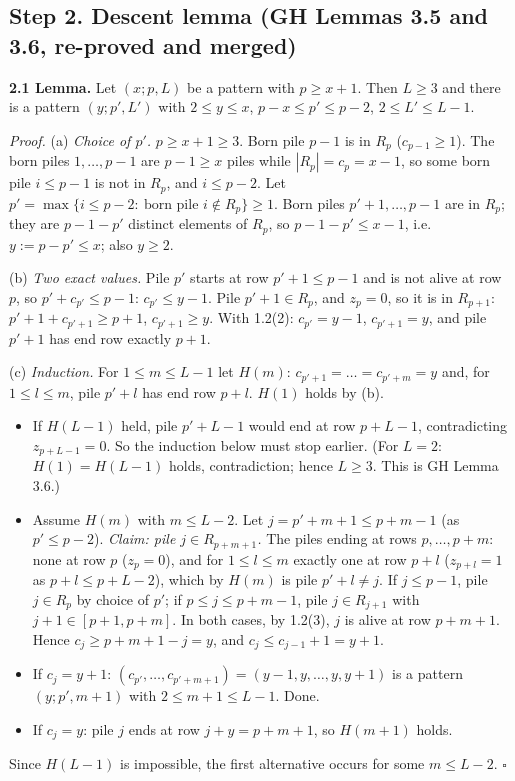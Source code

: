 \documentclass[11pt]{article}
\begin{document}
\subsection*{Step 2. Descent lemma (GH Lemmas 3.5 and 3.6, re-proved and merged)}

\textbf{2.1 Lemma.} Let $(x;p,L)$ be a pattern with $p\ge x+1$. Then $L\ge3$ and there is a pattern $(y;p',L')$ with $2\le y\le x$, $p-x\le p'\le p-2$, $2\le L'\le L-1$.

\emph{Proof.} (a) \emph{Choice of $p'$.} $p\ge x+1\ge3$. Born pile $p-1$ is in $R_p$ ($c_{p-1}\ge1$). The born piles $1,\dots,p-1$ are $p-1\ge x$ piles while $|R_p|=c_p=x-1$, so some born pile $i\le p-1$ is not in $R_p$, and $i\le p-2$. Let $p'=\max\{i\le p-2:\ \text{born pile } i\notin R_p\}\ge1$. Born piles $p'+1,\dots,p-1$ are in $R_p$; they are $p-1-p'$ distinct elements of $R_p$, so $p-1-p'\le x-1$, i.e.\ $y:=p-p'\le x$; also $y\ge2$.

(b) \emph{Two exact values.} Pile $p'$ starts at row $p'+1\le p-1$ and is not alive at row $p$, so $p'+c_{p'}\le p-1$: $c_{p'}\le y-1$. Pile $p'+1\in R_p$, and $z_p=0$, so it is in $R_{p+1}$: $p'+1+c_{p'+1}\ge p+1$, $c_{p'+1}\ge y$. With 1.2(2): $c_{p'}=y-1$, $c_{p'+1}=y$, and pile $p'+1$ has end row exactly $p+1$.

(c) \emph{Induction.} For $1\le m\le L-1$ let $H(m)$: $c_{p'+1}=\dots=c_{p'+m}=y$ and, for $1\le l\le m$, pile $p'+l$ has end row $p+l$. $H(1)$ holds by (b).
\begin{itemize}
\item If $H(L-1)$ held, pile $p'+L-1$ would end at row $p+L-1$, contradicting $z_{p+L-1}=0$. So the induction below must stop earlier. (For $L=2$: $H(1)=H(L-1)$ holds, contradiction; hence $L\ge3$. This is GH Lemma 3.6.)
\item Assume $H(m)$ with $m\le L-2$. Let $j=p'+m+1\le p+m-1$ (as $p'\le p-2$). \emph{Claim: pile $j\in R_{p+m+1}$.} The piles ending at rows $p,\dots,p+m$: none at row $p$ ($z_p=0$), and for $1\le l\le m$ exactly one at row $p+l$ ($z_{p+l}=1$ as $p+l\le p+L-2$), which by $H(m)$ is pile $p'+l\ne j$. If $j\le p-1$, pile $j\in R_p$ by choice of $p'$; if $p\le j\le p+m-1$, pile $j\in R_{j+1}$ with $j+1\in[p+1,p+m]$. In both cases, by 1.2(3), $j$ is alive at row $p+m+1$. Hence $c_j\ge p+m+1-j=y$, and $c_j\le c_{j-1}+1=y+1$.
\item If $c_j=y+1$: $(c_{p'},\dots,c_{p'+m+1})=(y-1,y,\dots,y,y+1)$ is a pattern $(y;p',m+1)$ with $2\le m+1\le L-1$. Done.
\item If $c_j=y$: pile $j$ ends at row $j+y=p+m+1$, so $H(m+1)$ holds.
\end{itemize}
Since $H(L-1)$ is impossible, the first alternative occurs for some $m\le L-2$. $\square$
\end{document}
